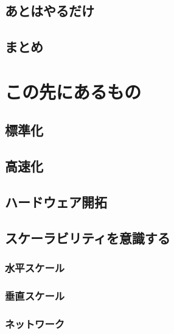 \documentclass[dvipdfmx]{jsarticle}
\begin{document}
\subsection{あとはやるだけ}

\subsection{まとめ}


\clearpage

\section{この先にあるもの}

\subsection{標準化}

\subsection{高速化}

\subsection{ハードウェア開拓}


\subsection{スケーラビリティを意識する}

\subsubsection{水平スケール}

\subsubsection{垂直スケール}

\subsubsection{ネットワーク}
\end{document}
